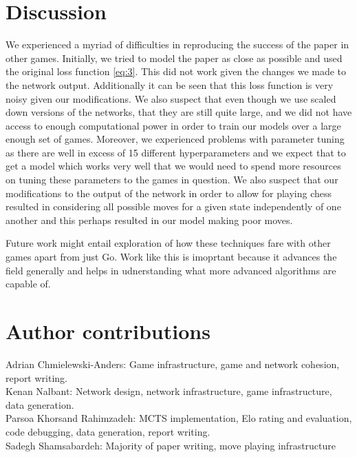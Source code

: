 \documentclass[english]{article}
\begin{document}
\section{Discussion}
We experienced a myriad of difficulties in reproducing the success of the paper
in other games.
Initially, we tried to model the paper as close as possible and used the
original loss function \ref{eq:3}. This did not work given the changes we made
to the network output. Additionally it can be seen that this loss function is
very noisy given our modifications.
We also suspect that even though we use scaled down versions of the networks,
that they are still quite large, and we did not have access to enough
computational power in order to train our models over a large enough set of
games. Moreover, we experienced problems with parameter tuning as there are well
in excess of 15 different hyperparameters and we expect that to get a model
which works very well that we would need to spend more resources on tuning these
parameters to the games in question. We also suspect that our modifications to
the output of the network in order to allow for playing chess resulted in
considering all possible moves for a given state independently of one another
and this perhaps resulted in our model making poor moves.

Future work might entail exploration of how these techniques fare with other
games apart from just Go. Work like this is imoprtant because it advances the
field generally and helps in udnerstanding what more advanced algorithms are
capable of.

\clearpage



\section{Author contributions}
Adrian Chmielewski-Anders: Game infrastructure, game and network cohesion, report writing.\\
Kenan Nalbant: Network design, network infrastructure, game infrastructure, data generation.\\
Parsoa Khorsand Rahimzadeh: MCTS implementation, Elo rating and evaluation, code debugging, data generation, report writing.\\
Sadegh Shamsabardeh: Majority of paper writing, move playing infrastructure
\end{document}
